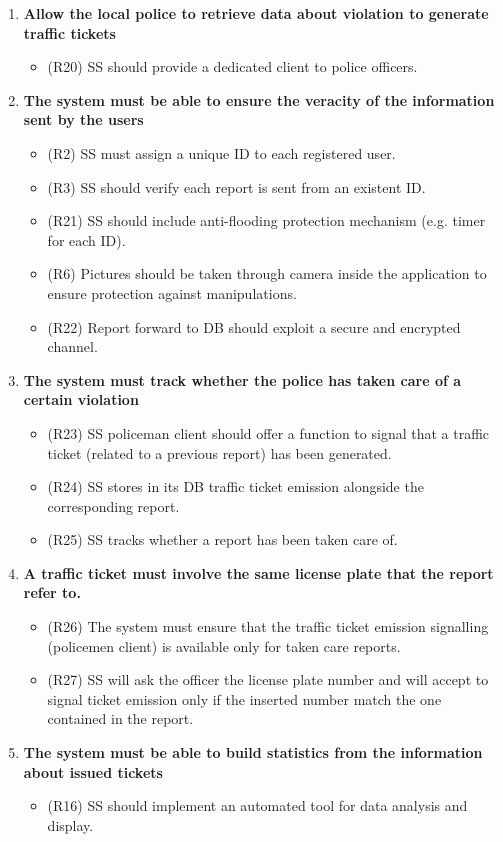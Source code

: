 \begin{enumerate} [label = GA 2.\arabic* - ]
	
\item \textbf{Allow the local police to retrieve data about violation to generate traffic tickets}
	\begin{itemize}
	\item (R20) SS should provide a dedicated client to police officers.
	\end{itemize}
	\bigskip
	
\item \textbf{The system must be able to ensure the veracity of the information sent by the users}
	\begin{itemize}
	\item (R2) SS must assign a unique ID to each registered user.
	\item (R3) SS should verify each report is sent from an existent ID.
	\item (R21) SS should include anti-flooding protection mechanism (e.g. timer for each ID).
	\item (R6) Pictures should be taken through camera inside the application to ensure protection against manipulations.
	\item (R22) Report forward to DB should exploit a secure and encrypted channel.
	\end{itemize}
	\bigskip

\item \textbf{The system must track whether the police has taken care of a certain violation}
	\begin{itemize}
	\item(R23) SS policeman client should offer a function to signal that a traffic ticket (related to a previous report) has been generated.
	\item(R24) SS stores in its DB traffic ticket emission alongside the corresponding report.
	\item(R25) SS tracks whether a report has been taken care of.
	\end{itemize}
	\bigskip
	
\item \textbf{A traffic ticket must involve the same license plate that the report refer to.}
	\begin{itemize}
	\item(R26) The system must ensure that the traffic ticket emission signalling (policemen client) is available only for taken care reports.
	\item(R27) SS will ask the officer the license plate number and will accept to signal ticket emission only if the inserted number match the one contained in the report.
	\end{itemize}
	\bigskip
	
\item \textbf{The system must be able to build statistics from the information about issued tickets}
	\begin{itemize}
	\item(R16) SS should implement an automated tool for data analysis and display.
	\end{itemize}
	\bigskip
	
	\end{enumerate}

